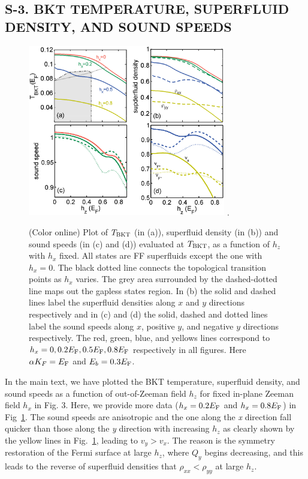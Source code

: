 \documentclass[prl,aps,twocolumn,showpacs, floatfix]{revtex4}
\begin{document}
\begin{widetext}
\section{S-3. BKT TEMPERATURE, SUPERFLUID DENSITY, AND SOUND SPEEDS}
\begin{figure}[t]
\includegraphics[width=3.4in]{T_hz_sub.eps} .
\caption{(Color online)  Plot of $T_{\rm BKT}$ (in (a)), superfluid density (in
(b)) and sound speeds (in (c) and (d)) evaluated at $T_{\rm BKT}$, as a function
of $h_{z}$ with $h_{x}$ fixed. All states are FF superfluids except the one
with $h_{x}=0$. The black dotted line connects the topological transition
points as $h_{x}$ varies. The grey area surrounded by the dashed-dotted line
maps out the gapless states region. In (b) the solid and dashed lines
label the superfluid densities along $x$ and $y$ directions respectively
and in (c) and (d) the solid, dashed and dotted lines label the sound
speeds along $x$, positive $y$, and negative $y$ directions respectively.
The red, green, blue, and yellows lines correspond to $h_x=0,0.2E_{\rm F},0.5E_{\rm F},0.8E_{\rm F}$
respectively in all figures.
Here $\protect\alpha %
K_{F}=E_{\rm F}$ and $E_{b}=0.3E_{\rm F}$.}
\label{TS_FF}
\end{figure}
In the main text, we have plotted the BKT temperature, superfluid density,
and sound speeds as a function of out-of-Zeeman field $h_z$ for fixed in-plane
Zeeman field $h_x$ in Fig. 3. Here, we provide more data ($h_x=0.2E_{\rm F}$ and $h_x=0.8E_{\rm F}$) in Fig~\ref{TS_FF}.
The sound speeds are anisotropic and the one along the \textit{x} direction fall
quicker than those along the \textit{y} direction with increasing $h_{z}$ as clearly
shown by the yellow lines in Fig.~\ref{TS_FF}, leading to $v_y>v_x$.
The reason is the symmetry restoration of the Fermi surface at large $h_{z}$,
where $Q_{y}$ begins decreasing, and this leads to the reverse of superfluid densities that
$\rho _{xx}<\rho _{yy}$ at large $h_{z}$.


\end{widetext}
\end{document}
